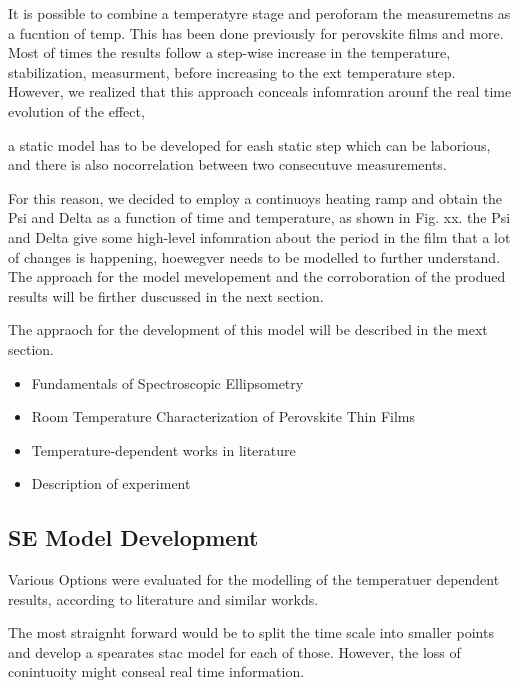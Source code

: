 It is possible to combine a temperatyre stage and peroforam the measuremetns as a fucntion of temp. This has been done previously for perovskite films and more. Most of times the results follow a step-wise increase in the temperature, stabilization, measurment, before increasing to the ext temperature step. However, we realized that this approach conceals infomration arounf the real time evolution of the effect, 

a static model has to be developed for eash static step which can be laborious, and there is also nocorrelation between two consecutuve measurements. 

For this reason, we decided to employ a continuoys heating ramp and obtain the Psi and Delta as a function of time and temperature, as shown in Fig. xx. the Psi and Delta give some high-level infomration about the period in the film that a lot of changes is happening, hoewegver needs to be modelled to further understand. The approach for the model mevelopement and the corroboration of the produed results will be firther duscussed in the next section. 

The appraoch for the development of this model will be described in the mext section.


\begin{itemize}
    \item Fundamentals of Spectroscopic Ellipsometry
    \item Room Temperature Characterization of Perovskite Thin Films
    \item Temperature-dependent works in literature
    \item Description of experiment
\end{itemize}

\subsection{SE Model Development}

Various Options were evaluated for the modelling of the temperatuer dependent results, according to literature and similar workds. 

The most straignht forward would be to split the time scale into smaller points and develop a spearates stac model for each of those. However, the loss of conintuoity might conseal real time information. 


